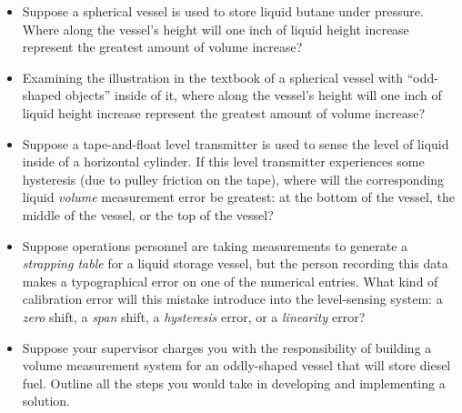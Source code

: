 \begin{itemize}
\item{} Suppose a spherical vessel is used to store liquid butane under pressure.  Where along the vessel's height will one inch of liquid height increase represent the greatest amount of volume increase?
\item{} Examining the illustration in the textbook of a spherical vessel with ``odd-shaped objects'' inside of it, where along the vessel's height will one inch of liquid height increase represent the greatest amount of volume increase?
\item{} Suppose a tape-and-float level transmitter is used to sense the level of liquid inside of a horizontal cylinder.  If this level transmitter experiences some hysteresis (due to pulley friction on the tape), where will the corresponding liquid {\it volume} measurement error be greatest: at the bottom of the vessel, the middle of the vessel, or the top of the vessel?
\item{} Suppose operations personnel are taking measurements to generate a {\it strapping table} for a liquid storage vessel, but the person recording this data makes a typographical error on one of the numerical entries.  What kind of calibration error will this mistake introduce into the level-sensing system: a {\it zero} shift, a {\it span} shift, a {\it hysteresis} error, or a {\it linearity} error?
\item{} Suppose your supervisor charges you with the responsibility of building a volume measurement system for an oddly-shaped vessel that will store diesel fuel.  Outline all the steps you would take in developing and implementing a solution.
\end{itemize}




